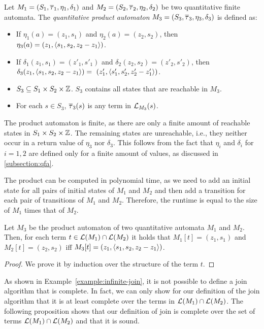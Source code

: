 \begin{definition}
    Let $M_1 = (S_1, \overline{\tau}_1, \eta_1, \delta_1)$ and $M_2 = (S_2, \overline{\tau}_2, \eta_2, \delta_2)$ be two quantitative finite automata.
    The \emph{quantitative product automaton} $M_3 = (S_3, \overline{\tau}_3, \eta_3, \delta_3)$ is defined as:
    \begin{itemize}
        \item If $\eta_1(a) = (z_1, s_1)$ and $\eta_2(a) = (z_2, s_2)$, then
              $\eta_3(a) = (z_1, \langle s_1, s_2, z_2-z_1\rangle)$.
        \item If $\delta_1(z_1, s_1) = (z'_1, s'_1)$ and $\delta_2(z_2, s_2) = (z'_2, s'_2)$, then $\delta_3(z_1, \angl{s_1, s_2, z_2 - z_1}) =  (z'_1, \angl{s'_1, s'_2, z'_2 -z'_1})$.
        \item $S_3 \subseteq S_1 \times S_2 \times \mathbb{Z}$. $S_3$ contains all states that are reachable in $M_3$.
        \item For each $s \in S_3$, $\overline{\tau}_3(s)$ is any term in $\mathcal{L}_{M_3}(s)$.
    \end{itemize}
\end{definition}

The product automaton is finite, as there are only a finite amount of reachable states in $S_1 \times S_2 \times \mathbb{Z}$.
The remaining states are unreachable, i.e., they neither occur in a return value of $\eta_3$ nor $\delta_3$.
This follows from the fact that $\eta_i$ and $\delta_i$ for $i = 1,2$ are defined only for a finite amount of values, as discussed in \cref{subsection:qfa}.

The product can be computed in polynomial time, as we need to add an initial state for all pairs of initial states of $M_1$ and $M_2$ and then add a transition for each pair of transitions of $M_1$ and $M_2$. Therefore, the runtime is equal to the size of $M_1$ times that of $M_2$.

\begin{lemma}\label{lemma:join-automata}
    Let $M_3$ be the product automaton of two quantitative automata $M_1$ and $M_2$.
    Then, for each term $t \in \mathcal{L}(M_1) \cap \mathcal{L}(M_2)$ it holds that $M_1[t] = (z_1, s_1)$ and $M_2[t] = (z_2, s_2)$ iff $M_3[t] = (z_1, \langle s_1, s_2, z_2 - z_1\rangle)$.
\end{lemma}
\begin{proof}
    We prove it by induction over the structure of the term $t$.
\end{proof}

As shown in Example~\ref{example:infinite-join}, it is not possible to define a join algorithm that is complete.
In fact, we can only show for our definition of the join algorithm that it is at least complete over the terms in $\mathcal{L}(M_1) \cap \mathcal{L}(M_2)$.
The following proposition shows that our definition of join is complete over the set of terms $\mathcal{L}(M_1) \cap \mathcal{L}(M_2)$ and that it is sound.

